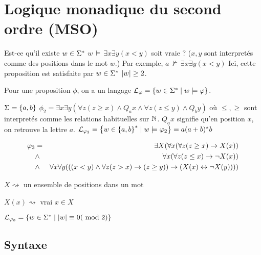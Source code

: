 \section{Logique monadique du second ordre (MSO)}

Est-ce qu'il existe $w \in \Sigma^{*}$ \tq $w \, \models \, \exists x \exists y (x < y)$ soit vraie ?
($x,y$ sont interpretés comme des positions dans le mot $w$.)
Par exemple, $a \, \nvDash \, \exists x \exists y (x < y)$
Ici, cette proposition est satisfaite par $w \in \Sigma^{*}$ \ssi $\left|w\right| \geq 2$.


Pour une proposition $\phi$, on a un langage $\mathcal{L}_\varphi = \left\{w \in \Sigma^{*} \mid w \models \varphi\right\}$.


\begin{exemple}
	$\Sigma = \left\{a,b\right\}$
	$\phi_2 = \exists x \exists y (\forall z (z \geq x) \land Q_a x \land \forall z (z \leq y) \land Q_b y)$
	où $\leq, \geq$ sont interpretés comme les relations habituelles sur $\mathbb{N}$.
	$Q_a x$ signifie qu'en position $x$, on retrouve la lettre $a$.
	$\mathcal{L}_{\varphi_2} = \left\{w \in \left\{a,b\right\}^{*} \mid w \models \varphi_2\right\} = a(a+b)^*b$
\end{exemple}


\begin{exemple} \label{example:phi3}

	\begin{eqnarray*}
		\varphi_3 &=& \exists X ( \forall x (\forall z (z \geq x) \rightarrow X(x)) \\
		&\land& \forall x (\forall z (z \leq x) \rightarrow \lnot X(x)) \\
		&\land& \forall x \forall y (((x < y) \land \forall z(z > x) \rightarrow (z \geq y)) \rightarrow (X (x) \leftrightarrow \lnot X(y))))
	\end{eqnarray*}



	$X \rightsquigarrow $ un ensemble de positions dans un mot


	$X (x)\rightsquigarrow$ vrai \ssi $x \in X$


	$\mathcal{L}_{\varphi_3} = \left\{w \in \Sigma^{*} \mid \left|w\right| \equiv 0 (\text { mod } 2)\right\}$
\end{exemple}

\subsection{Syntaxe}

